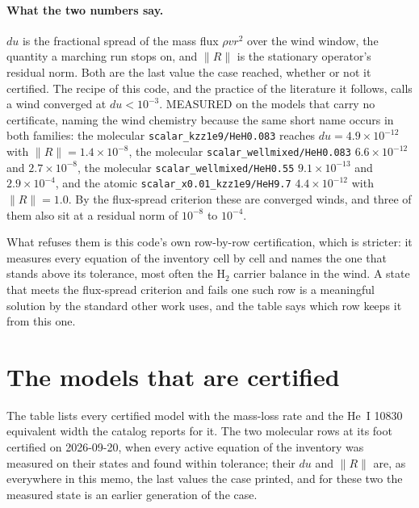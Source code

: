 \documentclass[11pt]{my_memo}
\begin{document}
\paragraph{What the two numbers say.} $du$ is the fractional spread of the
mass flux $\rho v r^2$ over the wind window, the quantity a marching run stops
on, and $\lVert R\rVert$ is the stationary operator's residual norm. Both are
the last value the case reached, whether or not it certified. The recipe of
this code, and the practice of the literature it follows, calls a wind
converged at $du < 10^{-3}$. MEASURED on the models that carry no certificate,
naming the wind chemistry because the same short name occurs in both families:
the molecular \texttt{scalar\_kzz1e9/HeH0.083} reaches
$du = 4.9\times10^{-12}$ with $\lVert R\rVert = 1.4\times10^{-8}$, the
molecular \texttt{scalar\_wellmixed/HeH0.083} $6.6\times10^{-12}$ and
$2.7\times10^{-8}$, the molecular \texttt{scalar\_wellmixed/HeH0.55}
$9.1\times10^{-13}$ and $2.9\times10^{-4}$, and the atomic
\texttt{scalar\_x0.01\_kzz1e9/HeH9.7} $4.4\times10^{-12}$ with
$\lVert R\rVert = 1.0$. By the flux-spread criterion these are converged
winds, and three of them also sit at a residual norm of $10^{-8}$ to
$10^{-4}$.

What refuses them is this code's own row-by-row certification, which is
stricter: it measures every equation of the inventory cell by cell and names
the one that stands above its tolerance, most often the H$_2$ carrier balance
in the wind. A state that meets the flux-spread criterion and fails one such
row is a meaningful solution by the standard other work uses, and the table
says which row keeps it from this one.

\section{The models that are certified}

The table lists every certified model with the mass-loss rate and the He~I
10830 equivalent width the catalog reports for it. The two molecular rows at
its foot certified on 2026-09-20, when every active equation of the inventory
was measured on their states and found within tolerance; their $du$ and
$\lVert R\rVert$ are, as everywhere in this memo, the last values the case
printed, and for these two the measured state is an earlier generation of the
case.
\end{document}
